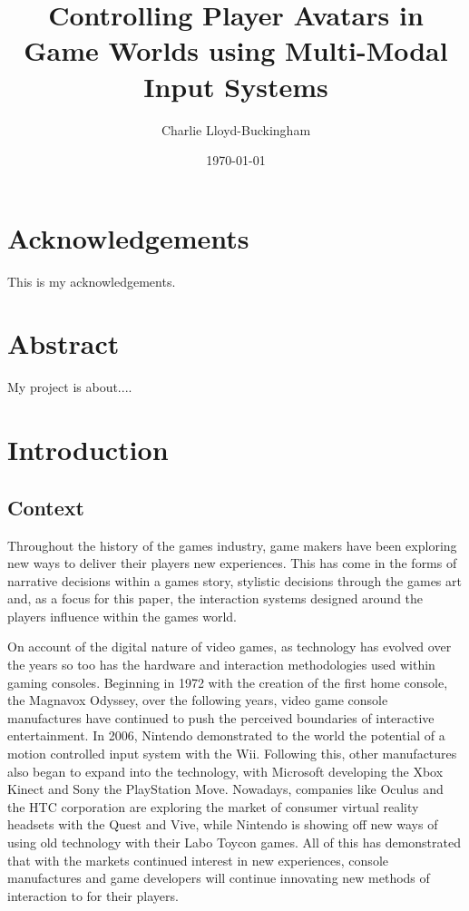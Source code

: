 \documentclass[11pt, a4paper]{article}
\title{Controlling Player Avatars in Game Worlds using Multi-Modal Input Systems}
\author{Charlie Lloyd-Buckingham}
\date{\today}
\begin{document}
\maketitle



\pagebreak
\section{Acknowledgements}	
This is my acknowledgements.

\section{Abstract}	
My project is about....



\pagebreak
\tableofcontents				%



\pagebreak
\section{Introduction}	
\subsection{Context}
Throughout the history of the games industry, game makers have been exploring new ways to deliver their players new experiences. This has come in the forms of narrative decisions within a games story, stylistic decisions through the games art and, as a focus for this paper, the interaction systems designed around the players influence within the games world. 

\hfill

On account of the digital nature of video games, as technology has evolved over the years so too has the hardware and interaction methodologies used within gaming consoles. Beginning in 1972 with the creation of the first home console, the Magnavox Odyssey, over the following years, video game console manufactures have continued to push the perceived boundaries of interactive entertainment. In 2006, Nintendo demonstrated to the world the potential of a motion controlled input system with the Wii. Following this, other manufactures also began to expand into the technology, with Microsoft developing the Xbox Kinect and Sony the PlayStation Move. Nowadays, companies like Oculus and the HTC corporation are exploring the market of consumer virtual reality headsets with the Quest and Vive, while Nintendo is showing off new ways of using old technology with their Labo Toycon games. All of this has demonstrated that with the markets continued interest in new experiences, console manufactures and game developers will continue innovating new methods of interaction to for their players.
\end{document}
